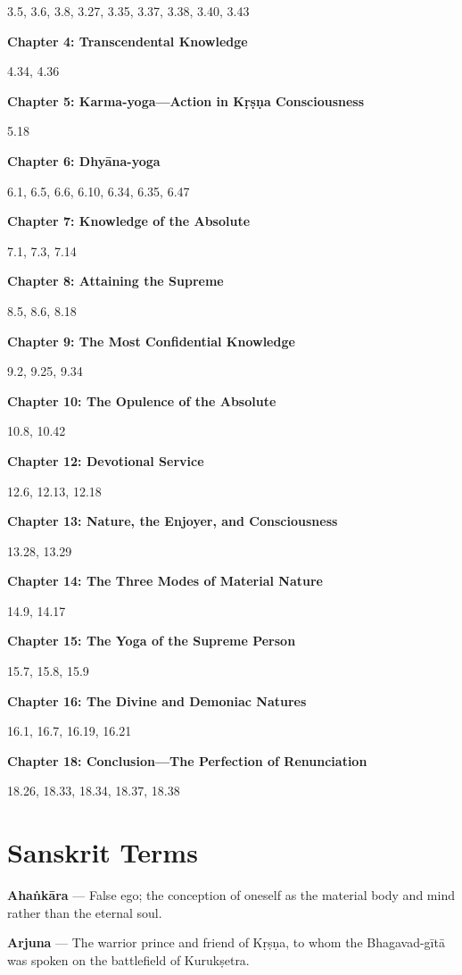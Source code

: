 \documentclass[11pt,twoside]{book}
\begin{document}
3.5, 3.6, 3.8, 3.27, 3.35, 3.37, 3.38, 3.40, 3.43

\textbf{Chapter 4: Transcendental Knowledge}

4.34, 4.36

\textbf{Chapter 5: Karma-yoga—Action in Kṛṣṇa Consciousness}

5.18

\textbf{Chapter 6: Dhyāna-yoga}

6.1, 6.5, 6.6, 6.10, 6.34, 6.35, 6.47

\textbf{Chapter 7: Knowledge of the Absolute}

7.1, 7.3, 7.14

\textbf{Chapter 8: Attaining the Supreme}

8.5, 8.6, 8.18

\textbf{Chapter 9: The Most Confidential Knowledge}

9.2, 9.25, 9.34

\textbf{Chapter 10: The Opulence of the Absolute}

10.8, 10.42

\textbf{Chapter 12: Devotional Service}

12.6, 12.13, 12.18

\textbf{Chapter 13: Nature, the Enjoyer, and Consciousness}

13.28, 13.29

\textbf{Chapter 14: The Three Modes of Material Nature}

14.9, 14.17

\textbf{Chapter 15: The Yoga of the Supreme Person}

15.7, 15.8, 15.9

\textbf{Chapter 16: The Divine and Demoniac Natures}

16.1, 16.7, 16.19, 16.21

\textbf{Chapter 18: Conclusion—The Perfection of Renunciation}

18.26, 18.33, 18.34, 18.37, 18.38

\chapter*{Sanskrit Terms}

\vspace{1\baselineskip}

\textbf{Ahaṅkāra} — False ego; the conception of oneself as the material body and mind rather than the eternal soul.

\textbf{Arjuna} — The warrior prince and friend of Kṛṣṇa, to whom the Bhagavad-gītā was spoken on the battlefield of Kurukṣetra.
\end{document}
